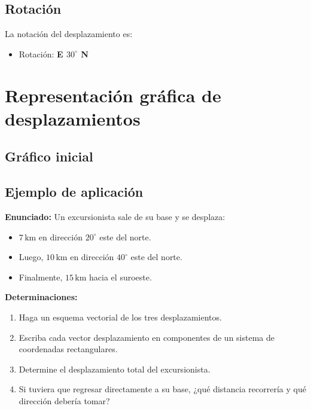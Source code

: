 \subsection{Rotaci\'on}

La notaci\'on del desplazamiento es:

\begin{itemize}
    \item Rotaci\'on: \textbf{E $30^{\circ}$ N}
\end{itemize}

\section*{Representación gráfica de desplazamientos}

\subsection*{Gráfico inicial}

\begin{center}
\end{center}

\subsection{Ejemplo de aplicación}

\textbf{Enunciado:} Un excursionista sale de su base y se desplaza:
\begin{itemize}
  \item $7\,\mathrm{km}$ en dirección $20^\circ$ este del norte.
  \item Luego, $10\,\mathrm{km}$ en dirección $40^\circ$ este del norte.
  \item Finalmente, $15\,\mathrm{km}$ hacia el suroeste.
\end{itemize}

\textbf{Determinaciones:}
\begin{enumerate}
  \item Haga un esquema vectorial de los tres desplazamientos.
  \item Escriba cada vector desplazamiento en componentes de un sistema de coordenadas rectangulares.
  \item Determine el desplazamiento total del excursionista.
  \item Si tuviera que regresar directamente a su base, ¿qué distancia recorrería y qué dirección debería tomar?
\end{enumerate}

